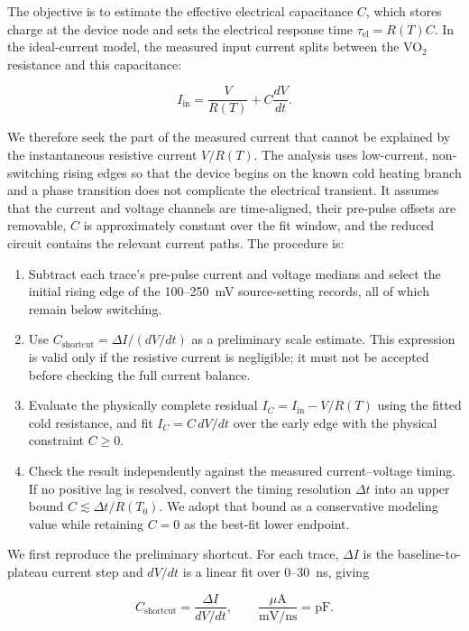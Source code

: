 \documentclass[11pt]{article}
\begin{document}
The objective is to estimate the effective electrical capacitance $C$, which stores
charge at the device node and sets the electrical response time
$\tau_{\mathrm{el}}=R(T)C$. In the ideal-current model, the measured input current
splits between the VO$_2$ resistance and this capacitance:

\begin{equation}
I_{\mathrm{in}}=\frac{V}{R(T)}+C\frac{dV}{dt}.
\end{equation}

We therefore seek the part of the measured current that cannot be explained by
the instantaneous resistive current $V/R(T)$. The analysis uses low-current,
non-switching rising edges so that the device begins on the known cold heating
branch and a phase transition does not complicate the electrical transient. It
assumes that the current and voltage channels are time-aligned, their pre-pulse
offsets are removable, $C$ is approximately constant over the fit window, and the
reduced circuit contains the relevant current paths. The procedure is:

\begin{enumerate}
\item Subtract each trace's pre-pulse current and voltage medians and select the
initial rising edge of the 100--250~mV source-setting records, all of which remain
below switching.
\item Use $C_{\mathrm{shortcut}}=\Delta I/(dV/dt)$ as a preliminary scale estimate.
This expression is valid only if the resistive current is negligible; it must not
be accepted before checking the full current balance.
\item Evaluate the physically complete residual
$I_C=I_{\mathrm{in}}-V/R(T)$ using the fitted cold resistance, and fit
$I_C=C\,dV/dt$ over the early edge with the physical constraint $C\geq0$.
\item Check the result independently against the measured current--voltage timing.
If no positive lag is resolved, convert the timing resolution $\Delta t$ into an
upper bound $C\lesssim\Delta t/R(T_0)$. We adopt that bound as a conservative
modeling value while retaining $C=0$ as the best-fit lower endpoint.
\end{enumerate}

We first reproduce the preliminary shortcut. For each trace, $\Delta I$ is the
baseline-to-plateau current step and $dV/dt$ is a linear fit over 0--30~ns, giving

\begin{equation}
C_{\mathrm{shortcut}}=\frac{\Delta I}{dV/dt},
\qquad
\frac{\mu\mathrm{A}}{\mathrm{mV/ns}}=\mathrm{pF}.
\end{equation}
\end{document}
